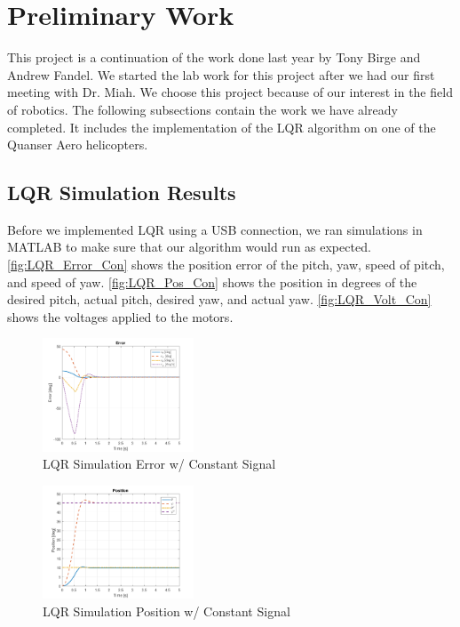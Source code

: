 \documentclass[letterpaper, 10pt, conference]{ieeeconf}
\begin{document}

\section{Preliminary Work}

This project is a continuation of the work done last year by Tony Birge and Andrew Fandel.  We started the lab work for this project after we had our first meeting with Dr. Miah.  We choose this project because of our interest in the field of robotics.  The following subsections contain the work we have already completed.  It includes the implementation of the LQR algorithm on one of the Quanser Aero helicopters.

\subsection{LQR Simulation Results} \label{sec:lqrsimresults}
Before we implemented LQR using a USB connection, we ran simulations in MATLAB to make sure that our algorithm would run as expected.  \autoref{fig:LQR_Error_Con} shows the position error of the pitch, yaw, speed of pitch, and speed of yaw.  \autoref{fig:LQR_Pos_Con} shows the position in degrees of the desired pitch, actual pitch, desired yaw, and actual yaw.  \autoref{fig:LQR_Volt_Con} shows the voltages applied to the motors.

\begin{figure}
  \centering
  \includegraphics[width=0.4\textwidth]{figs/matlab/LQR/P_Simulation/LQR_Error_Con}
  \caption{LQR Simulation Error w/ Constant Signal}
  \label{fig:LQR_Error_Con}
\end{figure}

\begin{figure}
  \centering
  \includegraphics[width=0.4\textwidth]{figs/matlab/LQR/P_Simulation/LQR_Pos_Con}
  \caption{LQR Simulation Position w/ Constant Signal}
  \label{fig:LQR_Pos_Con}
\end{figure}
\end{document}
